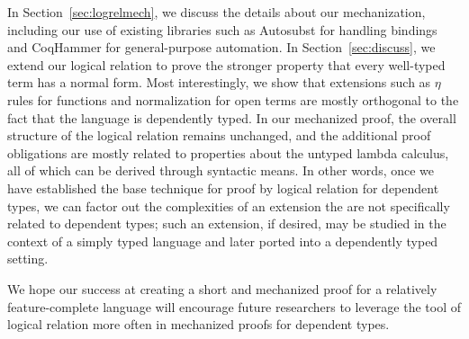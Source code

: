 \documentclass[acmsmall]{acmart}
\begin{document}
In Section~\ref{sec:logrelmech}, we discuss the details about our
mechanization, including our use of existing libraries such as
Autosubst for handling bindings and CoqHammer for general-purpose
automation. In Section~\ref{sec:discuss}, we extend our logical
relation to prove the stronger property that every well-typed term
has a normal form. Most interestingly, we show that extensions such
as $\eta$ rules for functions and normalization for open terms are
mostly orthogonal to the fact that the language is dependently
typed. In our mechanized proof, the overall
structure of the logical relation remains unchanged, and the additional
proof obligations are mostly related to properties about the untyped
lambda calculus, all of which can be derived through syntactic
means.
In other words, once we have established the base technique for
proof by logical relation for dependent types, we can factor out the
complexities of an extension the are not specifically related to dependent
types; such an extension, if desired, may be studied in the context of
a simply typed language and later ported into a dependently typed setting.

We hope our success at creating a short and mechanized proof for a
relatively feature-complete language will encourage future researchers
to leverage the tool of logical relation more often in mechanized
proofs for dependent types.







\end{document}
